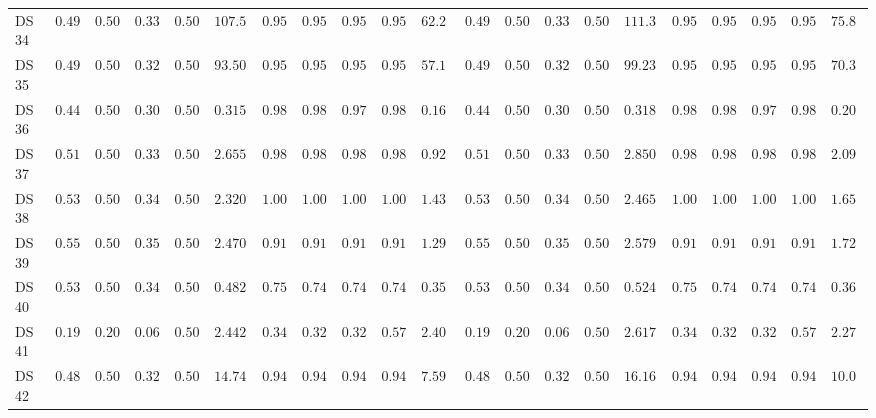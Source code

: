 {\begin{longtable}{|l|ccccc|ccccc|ccccc|ccccc|}
		DS 34 & $0.4933$ & $0.5000$ & $0.3304$ & $0.5000$ & $107.5001$ & $0.9533$ & $0.9532$ & $0.9533$ & $0.9532$ & $\boldsymbol{62.2833}$ & $0.4933$ & $0.5000$ & $0.3304$ & $0.5000$ & $111.3116$ & $0.9533$ & $0.9532$ & $0.9533$ & $0.9532$ & $75.8643$ \\
		DS 35 & $0.4917$ & $0.5000$ & $0.3296$ & $0.5000$ & $93.5012$ & $0.9583$ & $0.9582$ & $0.9583$ & $0.9582$ & $\boldsymbol{57.1429}$ & $0.4917$ & $0.5000$ & $0.3296$ & $0.5000$ & $99.2326$ & $0.9583$ & $0.9582$ & $0.9583$ & $0.9582$ & $70.3069$ \\
		DS 36 & $0.4400$ & $0.5000$ & $0.3056$ & $0.5000$ & $0.3156$ & $0.9800$ & $0.9821$ & $0.9798$ & $0.9821$ & $\boldsymbol{0.1684}$ & $0.4400$ & $0.5000$ & $0.3056$ & $0.5000$ & $0.3182$ & $0.9800$ & $0.9821$ & $0.9798$ & $0.9821$ & $0.2006$ \\
		DS 37 & $0.5133$ & $0.5000$ & $0.3392$ & $0.5000$ & $2.6558$ & $0.9823$ & $0.9823$ & $0.9823$ & $0.9823$ & $\boldsymbol{0.9274}$ & $0.5133$ & $0.5000$ & $0.3392$ & $0.5000$ & $2.8509$ & $0.9823$ & $0.9823$ & $0.9823$ & $0.9823$ & $2.0993$ \\
		DS 38 & $0.5310$ & $0.5000$ & $0.3468$ & $0.5000$ & $2.3208$ & $1.0000$ & $1.0000$ & $1.0000$ & $1.0000$ & $\boldsymbol{1.4328}$ & $0.5310$ & $0.5000$ & $0.3468$ & $0.5000$ & $2.4655$ & $\boldsymbol{1.0000}$ & $\boldsymbol{1.0000}$ & $\boldsymbol{1.0000}$ & $\boldsymbol{1.0000}$ & $1.6594$ \\
		DS 39 & $0.5575$ & $0.5000$ & $0.3580$ & $0.5000$ & $2.4701$ & $0.9115$ & $0.9103$ & $0.9103$ & $0.9103$ & $\boldsymbol{1.2909}$ & $0.5575$ & $0.5000$ & $0.3580$ & $0.5000$ & $2.5793$ & $0.9115$ & $0.9103$ & $0.9103$ & $0.9103$ & $1.7277$ \\
		DS 40 & $0.5370$ & $0.5000$ & $0.3494$ & $0.5000$ & $0.4823$ & $0.7593$ & $0.7455$ & $0.7444$ & $0.7455$ & $\boldsymbol{0.3524}$ & $0.5370$ & $0.5000$ & $0.3494$ & $0.5000$ & $0.5244$ & $0.7593$ & $0.7455$ & $0.7444$ & $0.7455$ & $0.3686$ \\
		DS 41 & $0.1983$ & $0.2000$ & $0.0662$ & $0.5000$ & $2.4422$ & $0.3448$ & $0.3268$ & $0.3261$ & $0.5792$ & $2.4061$ & $0.1983$ & $0.2000$ & $0.0662$ & $0.5000$ & $2.6173$ & $0.3448$ & $0.3268$ & $0.3261$ & $0.5792$ & $\boldsymbol{2.2789}$ \\
		DS 42 & $0.4818$ & $0.5000$ & $0.3251$ & $0.5000$ & $14.7444$ & $0.9453$ & $0.9458$ & $0.9452$ & $0.9458$ & $\boldsymbol{7.5910}$ & $0.4818$ & $0.5000$ & $0.3251$ & $0.5000$ & $16.1671$ & $\boldsymbol{0.9453}$ & $\boldsymbol{0.9458}$ & $\boldsymbol{0.9452}$ & $\boldsymbol{0.9458}$ & $10.0040$ \\

\end{longtable}}
